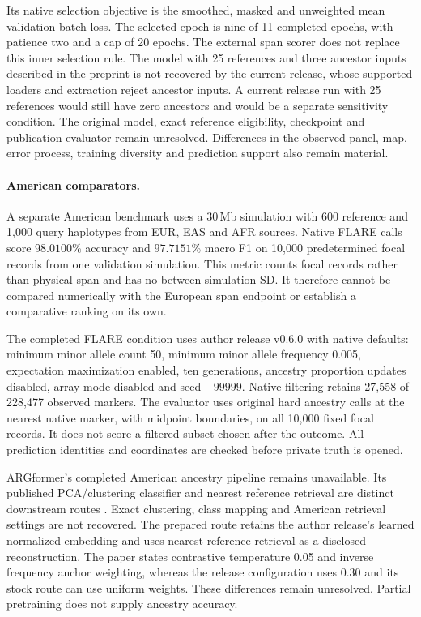 \documentclass[letterpaper]{article}
\begin{document}
Its native selection objective is the smoothed, masked and unweighted mean validation batch loss. The selected epoch is nine of 11 completed epochs, with patience two and a cap of 20 epochs. The external span scorer does not replace this inner selection rule. The model with 25 references and three ancestor inputs described in the preprint is not recovered by the current release, whose supported loaders and extraction reject ancestor inputs. A current release run with 25 references would still have zero ancestors and would be a separate sensitivity condition. The original model, exact reference eligibility, checkpoint and publication evaluator remain unresolved. Differences in the observed panel, map, error process, training diversity and prediction support also remain material.

\paragraph{American comparators.}
A separate American benchmark uses a 30\,Mb simulation with 600 reference and 1,000 query haplotypes from EUR, EAS and AFR sources. Native FLARE calls score $98.0100\%$ accuracy and $97.7151\%$ macro F1 on 10,000 predetermined focal records from one validation simulation. This metric counts focal records rather than physical span and has no between simulation SD. It therefore cannot be compared numerically with the European span endpoint or establish a comparative ranking on its own.

The completed FLARE condition uses author release v0.6.0 with native defaults: minimum minor allele count 50, minimum minor allele frequency 0.005, expectation maximization enabled, ten generations, ancestry proportion updates disabled, array mode disabled and seed $-99999$. Native filtering retains 27,558 of 228,477 observed markers. The evaluator uses original hard ancestry calls at the nearest native marker, with midpoint boundaries, on all 10,000 fixed focal records. It does not score a filtered subset chosen after the outcome. All prediction identities and coordinates are checked before private truth is opened.

ARGformer's completed American ancestry pipeline remains unavailable. Its published PCA/clustering classifier and nearest reference retrieval are distinct downstream routes \citep{argformer2026}. Exact clustering, class mapping and American retrieval settings are not recovered. The prepared route retains the author release's learned normalized embedding and uses nearest reference retrieval as a disclosed reconstruction. The paper states contrastive temperature 0.05 and inverse frequency anchor weighting, whereas the release configuration uses 0.30 and its stock route can use uniform weights. These differences remain unresolved. Partial pretraining does not supply ancestry accuracy.
\end{document}
